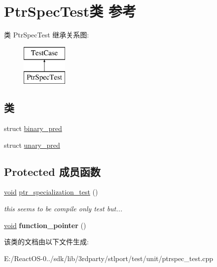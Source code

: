 \hypertarget{class_ptr_spec_test}{}\section{Ptr\+Spec\+Test类 参考}
\label{class_ptr_spec_test}
类 Ptr\+Spec\+Test 继承关系图\+:\begin{figure}[H]
\begin{center}
\leavevmode
\includegraphics[height=2.000000cm]{class_ptr_spec_test}
\end{center}
\end{figure}
\subsection*{类}
\begin{DoxyCompactItemize}
\item 
struct \hyperlink{struct_ptr_spec_test_1_1binary__pred}{binary\+\_\+pred}
\item 
struct \hyperlink{struct_ptr_spec_test_1_1unary__pred}{unary\+\_\+pred}
\end{DoxyCompactItemize}
\subsection*{Protected 成员函数}
\begin{DoxyCompactItemize}
\item 
\mbox{\label{class_ptr_spec_test_a3f1c0cda616aa24e99b692c5257885d5}} 
\hyperlink{interfacevoid}{void} \hyperlink{class_ptr_spec_test_a3f1c0cda616aa24e99b692c5257885d5}{ptr\+\_\+specialization\+\_\+test} ()
\begin{DoxyCompactList}\small\item\em this seems to be compile only test but... \end{DoxyCompactList}\item 
\mbox{\label{class_ptr_spec_test_aa30b52eed97b82d2c45905c52e7af025}} 
\hyperlink{interfacevoid}{void} {\bfseries function\+\_\+pointer} ()
\end{DoxyCompactItemize}


该类的文档由以下文件生成\+:\begin{DoxyCompactItemize}
\item 
E\+:/\+React\+O\+S-\/0../sdk/lib/3rdparty/stlport/test/unit/ptrspec\+\_\+test.\+cpp\end{DoxyCompactItemize}

